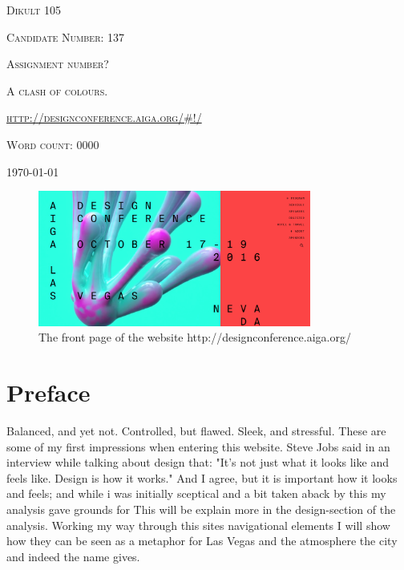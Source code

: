 \documentclass{article}
\begin{document}
	\begin{titlepage} 
		\centering
		{\scshape\Large Dikult 105\par}
		\vspace{2em}
		{\scshape\large Candidate Number: 137\par}
		\vspace{6em}
		{\scshape\Large Assignment number?\par}
		{\scshape\LARGE A clash of colours.\par}
		\vspace{1em}
		{\scshape\url{http://designconference.aiga.org/#!/}\par}
		\vfill
		{\scshape Word count: 0000\par}
		\vspace{3em}
		\large\today
	\end{titlepage}

	\begin{figure}[h!]
        \centering
        \includegraphics[width=0.8\textwidth]{frontPage}
        \caption{The front page of the website http://designconference.aiga.org/}
    \end{figure}
    \vspace{5em}
	\section{Preface}
	    Balanced, and yet not. Controlled, but flawed. Sleek, and stressful. These are some of my first impressions when entering this website. Steve Jobs said in an interview while talking about design that: "It's not just what it looks like and feels like. Design is how it works."\citep*{SteveJobsQuote} And I agree, but it is important how it looks and feels; and while i was initially sceptical and a bit taken aback by this my analysis gave grounds for   This will be explain more in the design-section of the analysis. Working my way through this sites navigational elements I will show how they can be seen as a metaphor for Las Vegas and the atmosphere the city and indeed the name gives.
\end{document}
